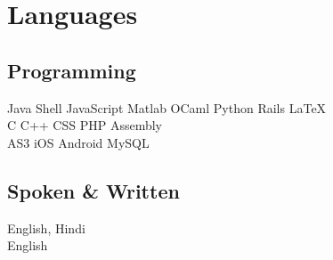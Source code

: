 \documentclass[]{deedy-resume-openfont}
\begin{document}
\section{Languages}
\begin{minipage}[t]{.6\textwidth}
\subsection{Programming}
Java \textbullet{}   Shell \textbullet{} JavaScript \textbullet{} Matlab \textbullet{}
OCaml \textbullet{} Python \textbullet{} Rails \textbullet{} \LaTeX\ \\ 
C \textbullet{} C++ \textbullet{} CSS \textbullet{} PHP \textbullet{} Assembly \\
AS3 \textbullet{} iOS \textbullet{} Android \textbullet{} MySQL
\sectionsep
\end{minipage}
\hfill
\begin{minipage}[t]{.35\textwidth}
\subsection{Spoken \& Written}
 English, Hindi\\
 English\\
\end{minipage}
\end{document}
